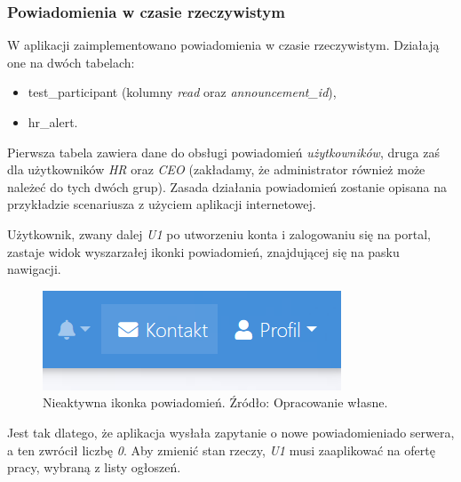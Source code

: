 \documentclass[twoside]{projektInzynierskiMS}
\numberwithin{figure}{section}
\begin{document}
\subsubsection{Powiadomienia w czasie rzeczywistym }
W aplikacji zaimplementowano powiadomienia w czasie rzeczywistym. Działają one na dwóch tabelach:
\begin{itemize}
    \item test\_participant (kolumny \textit{read} oraz \textit{announcement\_id}),
    \item hr\_alert.
\end{itemize}
Pierwsza tabela zawiera dane do obsługi powiadomień \textit{użytkowników}, druga zaś dla użytkowników \textit{HR} oraz \textit{CEO} (zakładamy, że administrator również może należeć do tych dwóch grup). Zasada działania powiadomień zostanie opisana na przykładzie scenariusza z użyciem aplikacji internetowej.

Użytkownik, zwany dalej \textit{U1} po utworzeniu konta i zalogowaniu się na portal, zastaje widok wyszarzałej ikonki powiadomień, znajdującej się na pasku nawigacji.

\newpage

\begin{figure}[h!]
    \centering
    \includegraphics[scale=0.5]{images/brakPowiadomien.png}
    \caption{Nieaktywna ikonka powiadomień. Źródło: Opracowanie własne.}
    \label{fig:brak_powiadomień}
\end{figure}

Jest tak dlatego, że aplikacja wysłała zapytanie o nowe powiadomienia\linebreak do serwera, a ten zwrócił liczbę \textit{0}. Aby zmienić stan rzeczy, \textit{U1} musi zaaplikować na ofertę pracy, wybraną z listy ogłoszeń.
\end{document}
